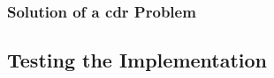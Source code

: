 \begin{frame}
\begin{multicols}{2}
        \vspace*{\fill}

    \end{multicols}
    \vspace*{\fill}
    
\end{frame}

\begin{frame}
    \frametitle{Solution of a \acrshort{cdr} Problem}

    
\end{frame}

\subsection{Testing the Implementation}

